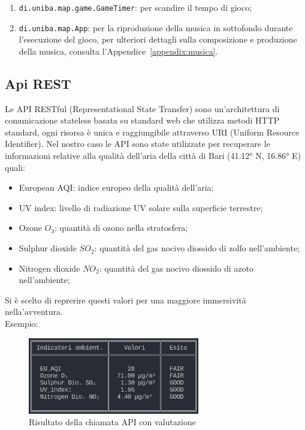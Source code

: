\documentclass[italian,12pt,a4paper]{article}
\begin{document}
	\begin{enumerate}
		\item \texttt{di.uniba.map.game.GameTimer}: per scandire il tempo di gioco;
		\item \texttt{di.uniba.map.App}: per la riproduzione della musica in sottofondo durante l'esecuzione del gioco, per ulteriori dettagli sulla composizione e produzione della musica, consulta l'Appendice~\ref{appendix:musica}.
	\end{enumerate}
	
	\subsection{Api REST}
	Le API RESTful (Representational State Transfer) sono un'architettura di comunicazione stateless basata su standard web che utilizza metodi HTTP standard, ogni risorsa è unica e raggiungibile attraverso URI  (Uniform Resource Identifier).
	Nel nostro caso le API sono state utilizzate per recuperare le informazioni relative alla qualità dell'aria della città di Bari (41.12° N, 16.86° E) quali:

		\begin{itemize}
			\item European AQI: indice europeo della qualità dell'aria; 
			\item UV index: livello di radiazione UV solare sulla superficie terrestre;
			\item Ozone $O_3$: quantità di ozono nella stratosfera;
			\item Sulphur dioxide $SO_2$: quantità del gas nocivo diossido di zolfo nell'ambiente;
			\item Nitrogen dioxide $NO_2$: quantità del gas nocivo diossido di azoto nell'ambiente;
			
		\end{itemize}
	Si è scelto di reprerire questi valori per una maggiore immersività nella'avventura.\\
	Esempio:
	\begin{figure}[!h]
		\centering
		\includegraphics[width=7.5cm]{screen_api}
		\caption{Risultato della chiamata API con valutazione}
		\label{fig:screenapi}
	\end{figure}
	
\end{document}
